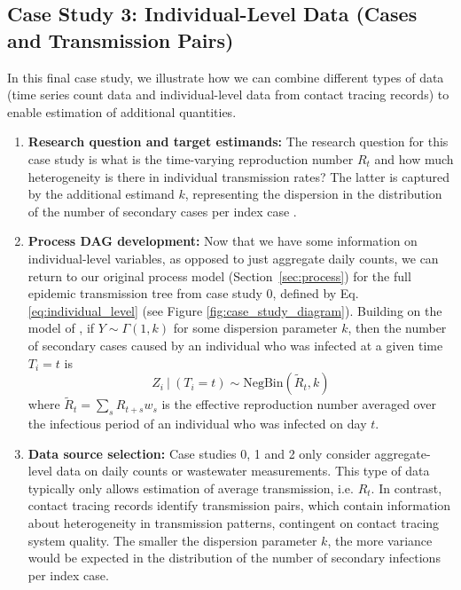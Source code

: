 \documentclass{article}
\begin{document}
\subsection{Case Study 3: Individual-Level Data (Cases and Transmission Pairs)}

In this final case study, we illustrate how we can combine different types of data (time series count data and individual-level data from contact tracing records) to enable estimation of additional quantities. 

\begin{enumerate}
   \item \textbf{Research question and target estimands:} The research question for this case study is what is the time-varying reproduction number $R_t$ and how much heterogeneity is there in individual transmission rates? The latter is captured by the additional estimand $k$, representing the dispersion in the distribution of the number of secondary cases per index case \citep{lloyd2005superspreading}. 
   
    \item \textbf{Process DAG development:} Now that we have some information on individual-level variables, as opposed to just aggregate daily counts, we can return to our original process model (Section~\ref{sec:process}) for the full epidemic transmission tree from case study 0, defined by Eq. \eqref{eq:individual_level} (see Figure \ref{fig:case_study_diagram}). 
    Building on the model of \citet{lloyd2005superspreading}, if $Y\sim \Gamma(1,k)$ for some dispersion parameter $k$, then the number of secondary cases caused by an individual who was infected at a given time $T_i=t$ is
     \begin{equation} \label{eq:offspring_dist}
        Z_i \ | \ (T_i=t) \sim \mathrm{NegBin}\left( \tilde{R}_{t}, k\right)
    \end{equation}   
    where $\tilde{R}_t= \sum_s R_{t+s} w_s$ is the effective reproduction number averaged over the infectious period of an individual who was infected on day $t$.
   
    \item \textbf{Data source selection:} Case studies 0, 1 and 2 only consider aggregate-level data on daily counts or wastewater measurements. This type of data typically only allows estimation of average transmission, i.e. $R_t$. In contrast, contact tracing records identify transmission pairs, which contain information about heterogeneity in transmission patterns, contingent on contact tracing system quality. The smaller the dispersion parameter $k$, the more variance would be expected in the distribution of the number of secondary infections per index case.
    

\end{enumerate}
\end{document}
